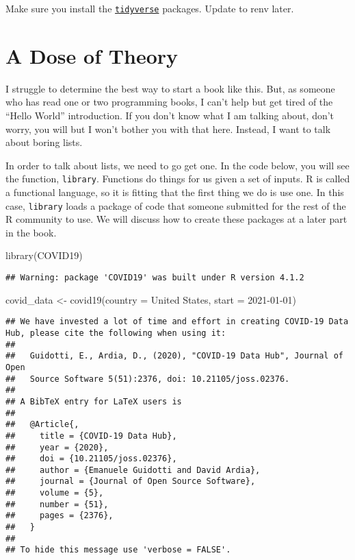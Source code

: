 \documentclass[
]{book}
\newenvironment{Shaded}{\begin{snugshade}}{\end{snugshade}}
\newcommand{\AttributeTok}[1]{\textcolor[rgb]{0.77,0.63,0.00}{#1}}
\newcommand{\FunctionTok}[1]{\textcolor[rgb]{0.00,0.00,0.00}{#1}}
\newcommand{\NormalTok}[1]{#1}
\newcommand{\OtherTok}[1]{\textcolor[rgb]{0.56,0.35,0.01}{#1}}
\newcommand{\StringTok}[1]{\textcolor[rgb]{0.31,0.60,0.02}{#1}}
\begin{document}
Make sure you install the \href{https://www.tidyverse.org/}{\texttt{tidyverse}} packages. Update to renv later.

\hypertarget{a-dose-of-theory}{%
\section{A Dose of Theory}\label{a-dose-of-theory}}

I struggle to determine the best way to start a book like this. But, as someone who has read one or two programming books, I can't help but get tired of the ``Hello World'' introduction. If you don't know what I am talking about, don't worry, you will but I won't bother you with that here. Instead, I want to talk about boring lists.

In order to talk about lists, we need to go get one. In the code below, you will see the function, \texttt{library}. Functions do things for us given a set of inputs. R is called a functional language, so it is fitting that the first thing we do is use one. In this case, \texttt{library} loads a package of code that someone submitted for the rest of the R community to use. We will discuss how to create these packages at a later part in the book.

\begin{Shaded}
\begin{Highlighting}[]
\FunctionTok{library}\NormalTok{(COVID19)}
\end{Highlighting}
\end{Shaded}

\begin{verbatim}
## Warning: package 'COVID19' was built under R version 4.1.2
\end{verbatim}

\begin{Shaded}
\begin{Highlighting}[]
\NormalTok{covid\_data }\OtherTok{\textless{}{-}} \FunctionTok{covid19}\NormalTok{(}\AttributeTok{country =} \StringTok{\textquotesingle{}United States\textquotesingle{}}\NormalTok{, }\AttributeTok{start =} \StringTok{\textquotesingle{}2021{-}01{-}01\textquotesingle{}}\NormalTok{)}
\end{Highlighting}
\end{Shaded}

\begin{verbatim}
## We have invested a lot of time and effort in creating COVID-19 Data Hub, please cite the following when using it:
## 
##   Guidotti, E., Ardia, D., (2020), "COVID-19 Data Hub", Journal of Open
##   Source Software 5(51):2376, doi: 10.21105/joss.02376.
## 
## A BibTeX entry for LaTeX users is
## 
##   @Article{,
##     title = {COVID-19 Data Hub},
##     year = {2020},
##     doi = {10.21105/joss.02376},
##     author = {Emanuele Guidotti and David Ardia},
##     journal = {Journal of Open Source Software},
##     volume = {5},
##     number = {51},
##     pages = {2376},
##   }
## 
## To hide this message use 'verbose = FALSE'.
\end{verbatim}
\end{document}
